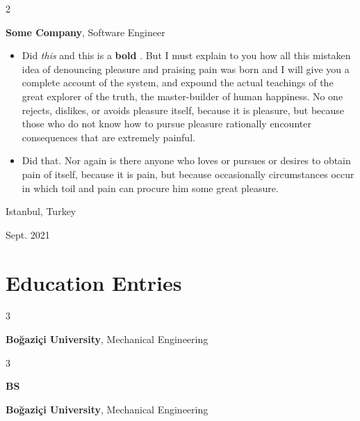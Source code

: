 \documentclass[10pt, letterpaper]{article}
\newenvironment{highlights}{
    \begin{itemize}[
        topsep=0.10 cm,
        parsep=0.10 cm,
        partopsep=0pt,
        itemsep=0pt,
        leftmargin=0.4 cm + 10pt
    ]
}{
    \end{itemize}
} %
\newenvironment{twocolentry}[2][]{
    \onecolentry
    \def\secondColumn{#2}
    \setcolumnwidth{\fill, 4.5 cm}
    \begin{paracol}{2}
}{
    \switchcolumn \raggedleft \secondColumn
    \end{paracol}
    \endonecolentry
} %
\newenvironment{threecolentry}[3][]{
    \onecolentry
    \def\thirdColumn{#3}
    \setcolumnwidth{1 cm, \fill, 4.5 cm}
    \begin{paracol}{3}
    {\raggedright #2} \switchcolumn
}{
    \switchcolumn \raggedleft \thirdColumn
    \end{paracol}
    \endonecolentry
} %
\let\hrefWithoutArrow\href
\renewcommand{\href}[2]{\hrefWithoutArrow{#1}{\mbox{\ifthenelse{\equal{#2}{}}{ }{#2 }\raisebox{.15ex}{\footnotesize \faExternalLink*}}}}
\begin{document}
        \vspace{0.2 cm}

        \begin{twocolentry}{
            Istanbul, Turkey

        Sept. 2021
        }
            \textbf{Some \textnormal{Company}}, Software Engineer
            \begin{highlights}
                \item Did \textit{this} and this is a \textbf{bold} \href{https://example.com}{link}. But I must explain to you how all this mistaken idea of denouncing pleasure and praising pain was born and I will give you a complete account of the system, and expound the actual teachings of the great explorer of the truth, the master-builder of human happiness. No one rejects, dislikes, or avoids pleasure itself, because it is pleasure, but because those who do not know how to pursue pleasure rationally encounter consequences that are extremely painful.
                \item Did that. Nor again is there anyone who loves or pursues or desires to obtain pain of itself, because it is pain, but because occasionally circumstances occur in which toil and pain can procure him some great pleasure.
            \end{highlights}
        \end{twocolentry}



    
    \section{Education Entries}



        
        \begin{threecolentry}{\textbf{}}{
            
        }
            \textbf{Boğaziçi University}, Mechanical Engineering
        \end{threecolentry}

        \vspace{0.2 cm}

        \begin{threecolentry}{\textbf{BS}}{
            
        }
            \textbf{Boğaziçi University}, Mechanical Engineering
        \end{threecolentry}

        \vspace{0.2 cm}
\end{document}
